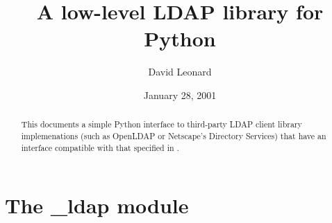 \documentclass{manual}
\title{A low-level LDAP library for Python}
\author{David Leonard}
\date{January 28, 2001}         %
\begin{document}
\maketitle

\begin{abstract}
\noindent
This documents a simple Python interface to third-party 
LDAP client library implemenations (such as OpenLDAP or 
Netscape's Directory Services) that have an interface compatible
with that specified in .
\end{abstract}

\tableofcontents

\chapter{The \_ldap module}



\renewcommand{\indexname}{Index}
\end{document}
